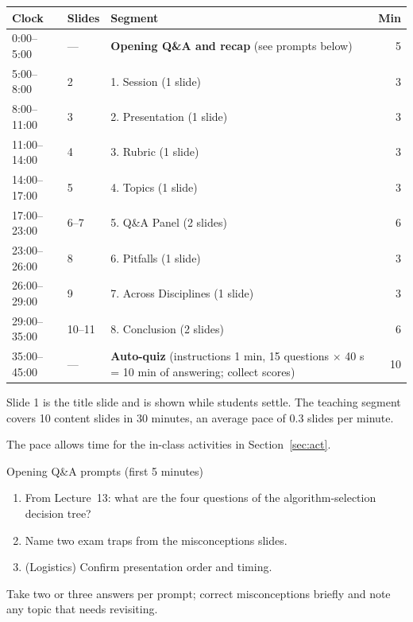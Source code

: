 \documentclass[11pt]{article}
\begin{document}
\begin{center}\small\renewcommand{\arraystretch}{1.2}\begin{tabularx}{\textwidth}{@{}l l X r@{}}\toprule\textbf{Clock} & \textbf{Slides} & \textbf{Segment} & \textbf{Min}\\\midrule

0:00--5:00 & --- & \textbf{Opening Q\&A and recap} (see prompts below) & 5\\

5:00--8:00 & 2 & 1. Session (1 slide) & 3\\

8:00--11:00 & 3 & 2. Presentation (1 slide) & 3\\

11:00--14:00 & 4 & 3. Rubric (1 slide) & 3\\

14:00--17:00 & 5 & 4. Topics (1 slide) & 3\\

17:00--23:00 & 6--7 & 5. Q\&A Panel (2 slides) & 6\\

23:00--26:00 & 8 & 6. Pitfalls (1 slide) & 3\\

26:00--29:00 & 9 & 7. Across Disciplines (1 slide) & 3\\

29:00--35:00 & 10--11 & 8. Conclusion (2 slides) & 6\\

35:00--45:00 & --- & \textbf{Auto-quiz} (instructions 1 min, 15 questions $\times$ 40 s = 10 min of answering; collect scores) & 10\\\bottomrule\end{tabularx}\end{center}

Slide 1 is the title slide and is shown while students settle. The teaching segment covers 10 content slides in 30 minutes, an average pace of 0.3 slides per minute. 

The pace allows time for the in-class activities in Section~\ref{sec:act}.

\begin{instr}{Opening Q\&A prompts (first 5 minutes)}\begin{enumerate}\item From Lecture~13: what are the four questions of the algorithm-selection decision tree?\item Name two exam traps from the misconceptions slides.\item (Logistics) Confirm presentation order and timing.\end{enumerate}Take two or three answers per prompt; correct misconceptions briefly and note any topic that needs revisiting.\end{instr}
\end{document}
